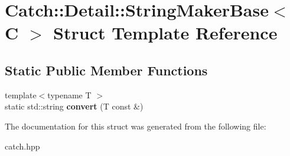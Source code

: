 \hypertarget{structCatch_1_1Detail_1_1StringMakerBase}{}\section{Catch\+:\+:Detail\+:\+:String\+Maker\+Base$<$ C $>$ Struct Template Reference}
\label{structCatch_1_1Detail_1_1StringMakerBase}
\subsection*{Static Public Member Functions}
\begin{DoxyCompactItemize}
\item 
{\footnotesize template$<$typename T $>$ }\\static std\+::string {\bfseries convert} (T const \&)\hypertarget{structCatch_1_1Detail_1_1StringMakerBase_a8eb9f635dc413a5758e22614bafaf1a3}{}\label{structCatch_1_1Detail_1_1StringMakerBase_a8eb9f635dc413a5758e22614bafaf1a3}

\end{DoxyCompactItemize}


The documentation for this struct was generated from the following file\+:\begin{DoxyCompactItemize}
\item 
catch.\+hpp\end{DoxyCompactItemize}
